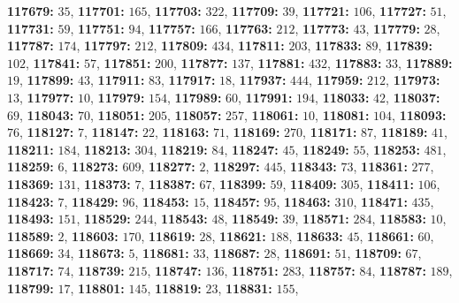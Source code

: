 \textsf{\bfseries 117679:} $35$, \textsf{\bfseries 117701:} $165$, \textsf{\bfseries 117703:} $322$, \textsf{\bfseries 117709:} $39$, \textsf{\bfseries 117721:} $106$, \textsf{\bfseries 117727:} $51$, \textsf{\bfseries 117731:} $59$, \textsf{\bfseries 117751:} $94$, \textsf{\bfseries 117757:} $166$, \textsf{\bfseries 117763:} $212$, \textsf{\bfseries 117773:} $43$, \textsf{\bfseries 117779:} $28$, \textsf{\bfseries 117787:} $174$, \textsf{\bfseries 117797:} $212$, \textsf{\bfseries 117809:} $434$, \textsf{\bfseries 117811:} $203$, \textsf{\bfseries 117833:} $89$, \textsf{\bfseries 117839:} $102$, \textsf{\bfseries 117841:} $57$, \textsf{\bfseries 117851:} $200$, \textsf{\bfseries 117877:} $137$, \textsf{\bfseries 117881:} $432$, \textsf{\bfseries 117883:} $33$, \textsf{\bfseries 117889:} $19$, \textsf{\bfseries 117899:} $43$, \textsf{\bfseries 117911:} $83$, \textsf{\bfseries 117917:} $18$, \textsf{\bfseries 117937:} $444$, \textsf{\bfseries 117959:} $212$, \textsf{\bfseries 117973:} $13$, \textsf{\bfseries 117977:} $10$, \textsf{\bfseries 117979:} $154$, \textsf{\bfseries 117989:} $60$, \textsf{\bfseries 117991:} $194$, \textsf{\bfseries 118033:} $42$, \textsf{\bfseries 118037:} $69$, \textsf{\bfseries 118043:} $70$, \textsf{\bfseries 118051:} $205$, \textsf{\bfseries 118057:} $257$, \textsf{\bfseries 118061:} $10$, \textsf{\bfseries 118081:} $104$, \textsf{\bfseries 118093:} $76$, \textsf{\bfseries 118127:} $7$, \textsf{\bfseries 118147:} $22$, \textsf{\bfseries 118163:} $71$, \textsf{\bfseries 118169:} $270$, \textsf{\bfseries 118171:} $87$, \textsf{\bfseries 118189:} $41$, \textsf{\bfseries 118211:} $184$, \textsf{\bfseries 118213:} $304$, \textsf{\bfseries 118219:} $84$, \textsf{\bfseries 118247:} $45$, \textsf{\bfseries 118249:} $55$, \textsf{\bfseries 118253:} $481$, \textsf{\bfseries 118259:} $6$, \textsf{\bfseries 118273:} $609$, \textsf{\bfseries 118277:} $2$, \textsf{\bfseries 118297:} $445$, \textsf{\bfseries 118343:} $73$, \textsf{\bfseries 118361:} $277$, \textsf{\bfseries 118369:} $131$, \textsf{\bfseries 118373:} $7$, \textsf{\bfseries 118387:} $67$, \textsf{\bfseries 118399:} $59$, \textsf{\bfseries 118409:} $305$, \textsf{\bfseries 118411:} $106$, \textsf{\bfseries 118423:} $7$, \textsf{\bfseries 118429:} $96$, \textsf{\bfseries 118453:} $15$, \textsf{\bfseries 118457:} $95$, \textsf{\bfseries 118463:} $310$, \textsf{\bfseries 118471:} $435$, \textsf{\bfseries 118493:} $151$, \textsf{\bfseries 118529:} $244$, \textsf{\bfseries 118543:} $48$, \textsf{\bfseries 118549:} $39$, \textsf{\bfseries 118571:} $284$, \textsf{\bfseries 118583:} $10$, \textsf{\bfseries 118589:} $2$, \textsf{\bfseries 118603:} $170$, \textsf{\bfseries 118619:} $28$, \textsf{\bfseries 118621:} $188$, \textsf{\bfseries 118633:} $45$, \textsf{\bfseries 118661:} $60$, \textsf{\bfseries 118669:} $34$, \textsf{\bfseries 118673:} $5$, \textsf{\bfseries 118681:} $33$, \textsf{\bfseries 118687:} $28$, \textsf{\bfseries 118691:} $51$, \textsf{\bfseries 118709:} $67$, \textsf{\bfseries 118717:} $74$, \textsf{\bfseries 118739:} $215$, \textsf{\bfseries 118747:} $136$, \textsf{\bfseries 118751:} $283$, \textsf{\bfseries 118757:} $84$, \textsf{\bfseries 118787:} $189$, \textsf{\bfseries 118799:} $17$, \textsf{\bfseries 118801:} $145$, \textsf{\bfseries 118819:} $23$, \textsf{\bfseries 118831:} $155$, 
